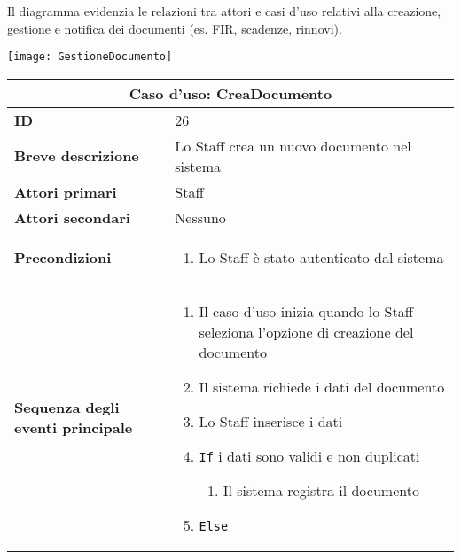 \documentclass[a4paper]{report}
\begin{document}
\clearpage


Il diagramma evidenzia le relazioni tra attori e casi d’uso relativi alla creazione, gestione e notifica dei documenti (es. FIR, scadenze, rinnovi).

\begin{figure*}[ht]
    \centering
    \texttt{[image: GestioneDocumento]}
\end{figure*}

\clearpage
\renewcommand{\arraystretch}{1.9}
\begin{table}[H]
\vspace*{-0cm}
\begin{tabular}{|p{3.9cm}|p{9.9cm}|}
\hline
\multicolumn{2}{|c|}{\textbf{Caso d’uso: CreaDocumento}} \\ \hline
	\textbf{ID} & 26 \\ \hline
	\textbf{Breve descrizione} & Lo Staff crea un nuovo documento nel sistema \\ \hline
	\textbf{Attori primari} & Staff \\ \hline
	\textbf{Attori secondari} & Nessuno \\ \hline
	\textbf{Precondizioni} & \begin{enumerate}[leftmargin=14pt,label=\arabic*.,labelsep=0.5em,topsep=0pt,partopsep=0pt,parsep=0pt,itemsep=0pt]
        \item Lo Staff è stato autenticato dal sistema
    \end{enumerate} \\ \hline
	\textbf{Sequenza degli eventi principale} &
\begin{enumerate}[leftmargin=14pt,label=\arabic*.,labelsep=0.5em,topsep=0pt,partopsep=0pt,parsep=0pt,itemsep=0pt]
    \item Il caso d’uso inizia quando lo Staff seleziona l'opzione di creazione del documento
    \item Il sistema richiede i dati del documento
    \item Lo Staff inserisce i dati
    \item \texttt{If} i dati sono validi e non duplicati
    \begin{enumerate}[label=\arabic{enumi}.\arabic*.,leftmargin=22pt,labelsep=0.5em,topsep=0pt,partopsep=0pt,parsep=0pt,itemsep=0pt]
        \item Il sistema registra il documento
    \end{enumerate}
    \item \texttt{Else}

\end{enumerate}
\end{tabular}
\end{table}
\end{document}
